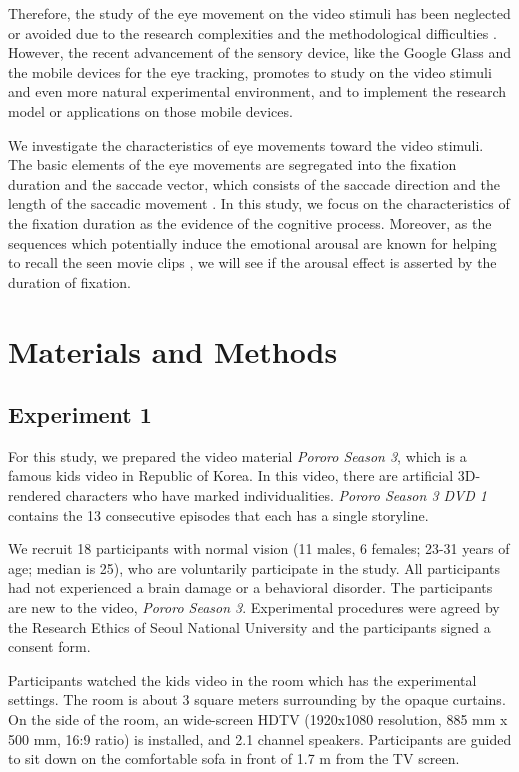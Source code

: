 \documentclass[oneside,master]{snueethesis}
\begin{document}
Therefore, the study of the eye movement on the video stimuli has been neglected or avoided due to the research complexities and the methodological difficulties \cite{Tatler2011}. However, the recent advancement of the sensory device, like the Google Glass and the mobile devices for the eye tracking, promotes to study on the video stimuli and even more natural experimental environment, and to implement the research model or applications on those mobile devices. 

We investigate the characteristics of eye movements toward the video stimuli. The basic elements of the eye movements are segregated into the fixation duration and the saccade vector, which consists of the saccade direction and the length of the saccadic movement \cite{Findlay1999,Feng2006}. In this study, we focus on the characteristics of the fixation duration as the evidence of the cognitive process. Moreover, as the sequences which potentially induce the emotional arousal are known for helping to recall the seen movie clips \cite{Cahill1996amyg,Cahill1998baso}, we will see if the arousal effect is asserted by the duration of fixation.

\chapter{Materials and Methods}
\label{sec:material-and-methods}


\section{Experiment 1}

For this study, we prepared the video material \textit{Pororo Season 3}, which is a famous kids video in Republic of Korea. In this video, there are artificial 3D-rendered characters who have marked individualities. \textit{Pororo Season 3 DVD 1} contains the 13 consecutive episodes that each has a single storyline.

We recruit 18 participants with normal vision (11 males, 6 females; 23-31 years of age; median is 25), who are voluntarily participate in the study. All participants had not experienced a brain damage or a behavioral disorder. The participants are new to the video, \textit{Pororo Season 3}. Experimental procedures were agreed by the Research Ethics of Seoul National University and the participants signed a consent form.

Participants watched the kids video in the room which has the experimental settings. The room is about 3 square meters surrounding by the opaque curtains. On the side of the room, an wide-screen HDTV (1920x1080 resolution, 885 mm x 500 mm, 16:9 ratio) is installed, and 2.1 channel speakers. Participants are guided to sit down on the comfortable sofa in front of 1.7 m from the TV screen.
\end{document}
